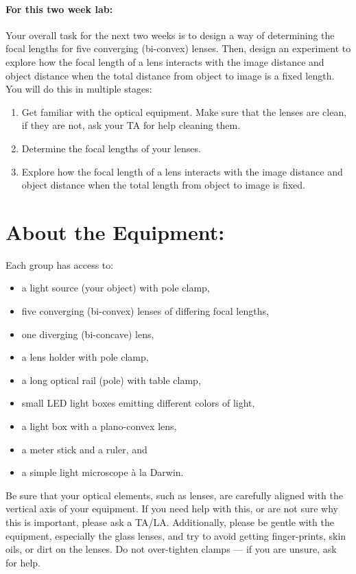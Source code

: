\paragraph{For this two week lab:} Your overall task for the next two weeks is to design a way of determining the focal lengths for five converging (bi-convex) lenses.
Then, design an experiment to explore how the focal length of a lens interacts with the image distance and object distance when the total distance from object to image is a fixed length.
You will do this in multiple stages:
\begin{enumerate}
\itemsep-0.2em
\item Get familiar with the optical equipment. Make sure that the lenses are clean, if they are not, ask your TA for help cleaning them.
\item Determine the focal lengths of your lenses.
\item Explore how the focal length of a lens interacts with the image distance and object distance when the total length from object to image is fixed.
\end{enumerate}

\section*{About the Equipment:}
Each group has access to:
\begin{itemize}
\itemsep-0.3em
\item a light source (your object) with pole clamp,
\item five converging (bi-convex) lenses of differing focal lengths,
\item one diverging (bi-concave) lens,
\item a lens holder with pole clamp,
\item a long optical rail (pole) with table clamp,
\item small LED light boxes emitting different colors of light,
\item a light box with a plano-convex lens,
\item a meter stick and a ruler, and
\item a simple light microscope à la Darwin.
\end{itemize}
Be sure that your optical elements, such as lenses, are carefully aligned with the vertical axis of your equipment. 
If you need help with this, or are not sure why this is important, please ask a TA/LA. 
Additionally, please be gentle with the equipment, especially the glass lenses, and try to avoid getting finger-prints, skin oils, or dirt on the lenses. Do not over-tighten clamps — if you are unsure, ask for help.
